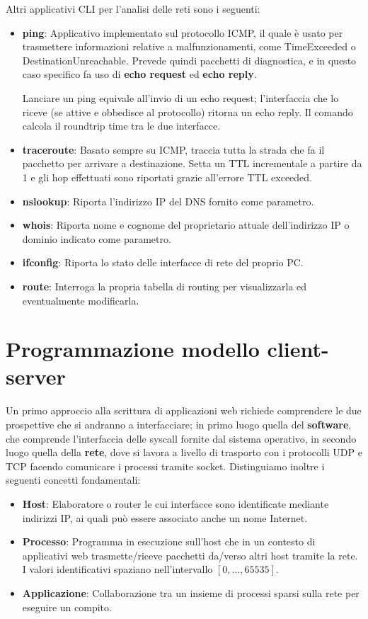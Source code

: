 \noindent Altri applicativi CLI per l'analisi delle reti sono i seguenti: \begin{itemize}
    \item \textbf{ping}: Applicativo implementato sul protocollo ICMP, il quale è usato per trasmettere informazioni relative a malfunzionamenti, come
    TimeExceeded o DestinationUnreachable. Prevede quindi pacchetti di diagnostica, e in questo caso specifico fa uso di \textbf{echo request} ed
    \textbf{echo reply}.\par
    Lanciare un ping equivale all'invio di un echo request; l'interfaccia che lo riceve (se attive e obbedisce al protocollo) ritorna un echo reply.
    Il comando calcola il roundtrip time tra le due interfacce.
    \item \textbf{traceroute}: Basato sempre su ICMP, traccia tutta la strada che fa il pacchetto per arrivare a destinazione. Setta un TTL incrementale
    a partire da 1 e gli hop effettuati sono riportati grazie all'errore TTL exceeded.
    \item \textbf{nslookup}: Riporta l'indirizzo IP del DNS fornito come parametro.
    \item \textbf{whois}: Riporta nome e cognome del proprietario attuale dell'indirizzo IP o dominio indicato come parametro.
    \item \textbf{ifconfig}: Riporta lo stato delle interfacce di rete del proprio PC.
    \item \textbf{route}: Interroga la propria tabella di routing per visualizzarla ed eventualmente modificarla.
\end{itemize}

%

\section{Programmazione modello client-server}
Un primo approccio alla scrittura di applicazioni web richiede comprendere le due prospettive che si andranno a interfacciare; in primo luogo quella del
\textbf{software}, che comprende l'interfaccia delle syscall fornite dal sistema operativo, in secondo luogo quella della \textbf{rete}, dove si lavora
a livello di trasporto con i protocolli UDP e TCP facendo comunicare i processi tramite socket. Distinguiamo inoltre i seguenti concetti fondamentali:
\begin{itemize}
    \item \textbf{Host}: Elaboratore o router le cui interfacce sono identificate mediante indirizzi IP, ai quali può essere associato anche un nome
    Internet.
    \item \textbf{Processo}: Programma in esecuzione sull'host che in un contesto di applicativi web trasmette/riceve pacchetti da/verso altri host
    tramite la rete. I valori identificativi spaziano nell'intervallo $[0, ..., 65535]$.
    \item \textbf{Applicazione}: Collaborazione tra un insieme di processi sparsi sulla rete per eseguire un compito.
\end{itemize}

